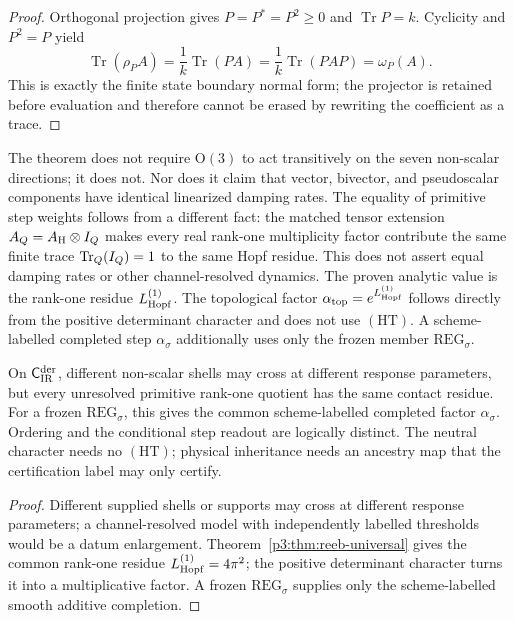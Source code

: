 \documentclass[12pt,a4paper]{article}
\begin{document}
\begin{proof}
Orthogonal projection gives \(P=P^*=P^2\ge0\) and
\(\operatorname{Tr}P=k\).  Cyclicity and \(P^2=P\) yield
\[
 \operatorname{Tr}(\rho_PA)
 =\frac1k\operatorname{Tr}(PA)
 =\frac1k\operatorname{Tr}(PAP)=\omega_P(A).
\]
This is exactly the finite state boundary normal form; the projector is
retained before evaluation and therefore cannot be erased by rewriting the
coefficient as a trace.
\end{proof}

\begin{remark}
The theorem does not require \(\mathrm O(3)\) to act transitively on the seven non-scalar directions;
it does not.  Nor does it claim that vector, bivector, and pseudoscalar components have identical
linearized damping rates.  The equality of primitive step weights follows from a different fact:
the matched tensor extension \(A_Q=A_{\rm H}\otimes I_Q\) makes every
real rank-one multiplicity factor contribute the same finite trace
\(\operatorname{Tr}_Q(I_Q)=1\) to the same Hopf residue.  This does not assert equal damping
rates or other channel-resolved dynamics.  The proven analytic value is the
rank-one residue \(L_{\mathrm{Hopf}}^{(1)}\).  The topological factor
\(\alpha_{\rm top}=e^{L_{\mathrm{Hopf}}^{(1)}}\) follows directly from the positive
determinant character and does not use \((\mathrm{HT})\).  A scheme-labelled
completed step \(\alpha_\sigma\) additionally uses only the frozen member
\(\mathrm{REG}_\sigma\).
\end{remark}

\begin{proposition}
\label{p3:prop:ordering-versus-step-size}
On \(\mathsf C_{\rm IR}^{\rm der}\), different non-scalar shells may cross at different response parameters, but
every unresolved primitive rank-one quotient has the same contact residue.
For a frozen \(\mathrm{REG}_\sigma\), this gives the common
scheme-labelled completed factor \(\alpha_\sigma\).  Ordering and the
conditional step readout are logically distinct.  The neutral character needs
no \((\mathrm{HT})\); physical inheritance needs an ancestry map that the
certification label may only certify.
\end{proposition}

\begin{proof}
Different supplied shells or supports may cross at different response
parameters; a channel-resolved model with independently labelled thresholds
would be a datum enlargement.  Theorem~\ref{p3:thm:reeb-universal} gives the common rank-one
residue \(L_{\mathrm{Hopf}}^{(1)}=4\pi^2\); the positive determinant character turns it into
a multiplicative factor.  A frozen \(\mathrm{REG}_\sigma\) supplies only the
scheme-labelled smooth additive completion.
\end{proof}
\end{document}
